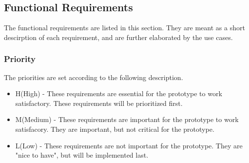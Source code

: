 \subsection{Functional Requirements}
The functional requirements are listed in this section. They are meant as a short descirption of each requirement, and are further elaborated by the use cases.

\subsubsection{Priority}
The priorities are set according to the following description.
\begin{itemize}
 \item H(High) - These requirements are essential for the prototype to work satisfactory. These requirements will be prioritized first.
 \item M(Medium) - These requirements are important for the prototype to work satisfacory. They are important, but not critical for the prototype.
 \item L(Low) - These requirements are not important for the prototype. They are "nice to have", but will be implemented last.
\end{itemize}

